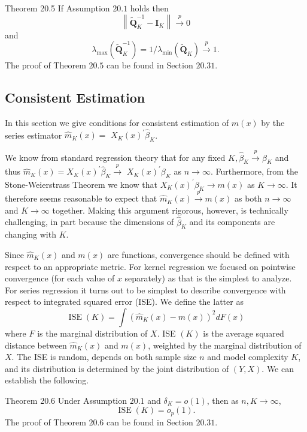 \documentclass[10pt]{article}
\begin{document}
Theorem 20.5 If Assumption $20.1$ holds then
$$
\left\|\widetilde{\boldsymbol{Q}}_{K}^{-1}-\boldsymbol{I}_{K}\right\| \stackrel{p}{\longrightarrow} 0
$$
and
$$
\lambda_{\max }\left(\widetilde{\boldsymbol{Q}}_{K}^{-1}\right)=1 / \lambda_{\min }\left(\widetilde{\boldsymbol{Q}}_{K}\right) \stackrel{p}{\longrightarrow} 1 .
$$
The proof of Theorem $20.5$ can be found in Section $20.31$.

\subsection{Consistent Estimation}
In this section we give conditions for consistent estimation of $m(x)$ by the series estimator $\widehat{m}_{K}(x)=$ $X_{K}(x)^{\prime} \widehat{\beta}_{K}$.

We know from standard regression theory that for any fixed $K, \widehat{\beta}_{K} \stackrel{p}{\rightarrow} \beta_{K}$ and thus $\widehat{m}_{K}(x)=X_{K}(x)^{\prime} \widehat{\beta}_{K} \stackrel{p}{\rightarrow}$ $X_{K}(x)^{\prime} \beta_{K}$ as $n \rightarrow \infty$. Furthermore, from the Stone-Weierstrass Theorem we know that $X_{K}(x)^{\prime} \beta_{K} \rightarrow m(x)$ as $K \rightarrow \infty$. It therefore seems reasonable to expect that $\hat{m}_{K}(x) \stackrel{p}{\longrightarrow} m(x)$ as both $n \rightarrow \infty$ and $K \rightarrow \infty$ together. Making this argument rigorous, however, is technically challenging, in part because the dimensions of $\widehat{\beta}_{K}$ and its components are changing with $K$.

Since $\widehat{m}_{K}(x)$ and $m(x)$ are functions, convergence should be defined with respect to an appropriate metric. For kernel regression we focused on pointwise convergence (for each value of $x$ separately) as that is the simplest to analyze. For series regression it turns out to be simplest to describe convergence with respect to integrated squared error (ISE). We define the latter as
$$
\operatorname{ISE}(K)=\int\left(\widehat{m}_{K}(x)-m(x)\right)^{2} d F(x)
$$
where $F$ is the marginal distribution of $X$. ISE $(K)$ is the average squared distance between $\widehat{m}_{K}(x)$ and $m(x)$, weighted by the marginal distribution of $X$. The ISE is random, depends on both sample size $n$ and model complexity $K$, and its distribution is determined by the joint distribution of $(Y, X)$. We can establish the following.

Theorem 20.6 Under Assumption $20.1$ and $\delta_{K}=o(1)$, then as $n, K \rightarrow \infty$,
$$
\operatorname{ISE}(K)=o_{p}(1) .
$$
The proof of Theorem $20.6$ can be found in Section $20.31$.
\end{document}
